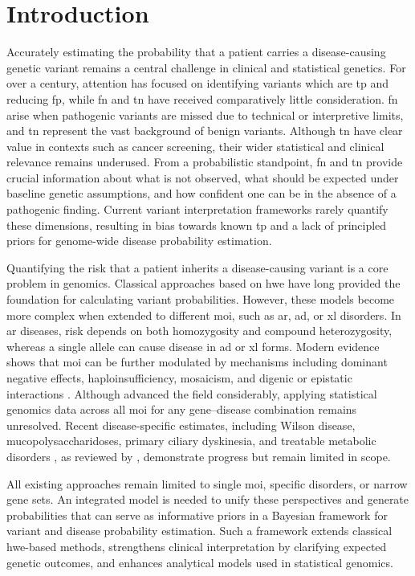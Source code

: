 \section{Introduction}
Accurately estimating the probability that a patient carries a disease-causing genetic variant remains a central challenge in clinical and statistical genetics. For over a century, attention has focused on identifying variants which are \ac{tp} and reducing \ac{fp}, while \ac{fn} and \ac{tn} have received comparatively little consideration. \ac{fn} arise when pathogenic variants are missed due to technical or interpretive limits, and \ac{tn} represent the vast background of benign variants. Although \ac{tn} have clear value in contexts such as cancer screening, their wider statistical and clinical relevance remains underused. From a probabilistic standpoint, \ac{fn} and \ac{tn} provide crucial information about what is not observed, what should be expected under baseline genetic assumptions, and how confident one can be in the absence of a pathogenic finding. Current variant interpretation frameworks rarely quantify these dimensions, resulting in bias towards known \ac{tp} and a lack of principled priors for genome-wide disease probability estimation.

Quantifying the risk that a patient inherits a disease-causing variant is a core problem in genomics. Classical approaches based on \ac{hwe} \cite{MayoCentury2008, AbramovsHardyWeinberg2020} have long provided the foundation for calculating variant probabilities. However, these models become more complex when extended to different \ac{moi}, such as \ac{ar}, \ac{ad}, or \ac{xl} disorders. In \ac{ar} diseases, risk depends on both homozygosity and compound heterozygosity, whereas a single allele can cause disease in \ac{ad} or \ac{xl} forms. Modern evidence shows that \ac{moi} can be further modulated by mechanisms including dominant negative effects, haploinsufficiency, mosaicism, and digenic or epistatic interactions \cite{zschocke_mendelian_2023}. Although \citet{karczewski2020mutational} advanced the field considerably, applying statistical genomics data across all \ac{moi} for any gene–disease combination remains unresolved. Recent disease-specific estimates, including Wilson disease, mucopolysaccharidoses, primary ciliary dyskinesia, and treatable metabolic disorders \cite{bick_estimating_2025, evans_estimating_2021}, as reviewed by \citet{hannah_using_2024}, demonstrate progress but remain limited in scope.

All existing approaches remain limited to single \ac{moi}, specific disorders, or narrow gene sets. An integrated model is needed to unify these perspectives and generate probabilities that can serve as informative priors in a Bayesian framework for variant and disease probability estimation. Such a framework extends classical \ac{hwe}-based methods, strengthens clinical interpretation by clarifying expected genetic outcomes, and enhances analytical models used in statistical genomics.

